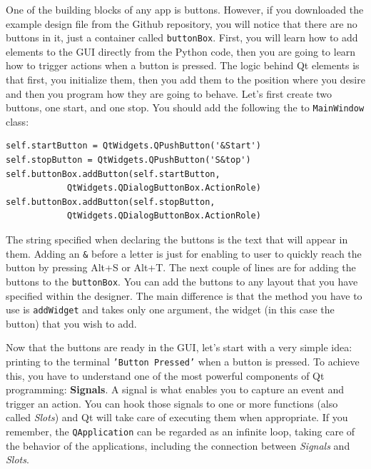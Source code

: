 One of the building blocks of any app is buttons. However, if you
downloaded the example design file from the Github repository, you will
notice that there are no buttons in it, just a container called
\texttt{buttonBox}. First, you will learn how to add elements to the
{GUI} directly from the Python code, then you are going to learn how to
trigger actions when a button is pressed. The logic behind Qt elements
is that first, you initialize them, then you add them to the position
where you desire and then you program how they are going to behave.
Let's first create two buttons, one start, and one stop. You should add
the following the to \texttt{MainWindow} class:

\begin{verbatim}
self.startButton = QtWidgets.QPushButton('&Start')
self.stopButton = QtWidgets.QPushButton('S&top')
self.buttonBox.addButton(self.startButton, 
            QtWidgets.QDialogButtonBox.ActionRole)
self.buttonBox.addButton(self.stopButton, 
            QtWidgets.QDialogButtonBox.ActionRole)
\end{verbatim}

The string specified when declaring the buttons is the text that will
appear in them. Adding an \texttt{\&} before a letter is just for
enabling to user to quickly reach the button by pressing Alt+S or Alt+T.
The next couple of lines are for adding the buttons to the
\texttt{buttonBox}. You can add the buttons to any layout that you have
specified within the designer. The main difference is that the method
you have to use is \texttt{addWidget} and takes only one argument, the
widget (in this case the button) that you wish to add.


Now that the buttons are ready in the {GUI}, let's start with a very
simple idea: printing to the terminal \texttt{'Button Pressed'} when a button
is pressed. To achieve this, you have to understand one of the most
powerful components of Qt programming: \textbf{Signals}. A signal is
what enables you to capture an event and trigger an action. You can hook
those signals to one or more functions (also called \emph{Slots}) and Qt
will take care of executing them when appropriate. If you remember, the
\texttt{QApplication} can be regarded as an infinite loop, taking care
of the behavior of the applications, including the connection between
\emph{Signals} and \emph{Slots}.

